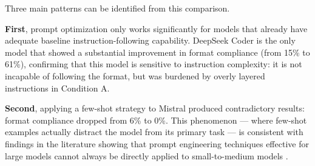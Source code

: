 \begin{table}[h]
\caption{Comparison of primary metrics between Conditions A and B for the five LLM models}
\vspace{0.5em}
\centering
\label{tab:ab-comparison}
\end{table}

Three main patterns can be identified from this comparison.

\textbf{First}, prompt optimization only works significantly for models that already have adequate baseline instruction-following capability. DeepSeek Coder is the only model that showed a substantial improvement in format compliance (from 15\% to 61\%), confirming that this model is sensitive to instruction complexity: it is not incapable of following the format, but was burdened by overly layered instructions in Condition A.

\textbf{Second}, applying a few-shot strategy to Mistral produced contradictory results: format compliance dropped from 6\% to 0\%. This phenomenon — where few-shot examples actually distract the model from its primary task — is consistent with findings in the literature showing that prompt engineering techniques effective for large models cannot always be directly applied to small-to-medium models \cite{akuthota2023vulnerability}.

